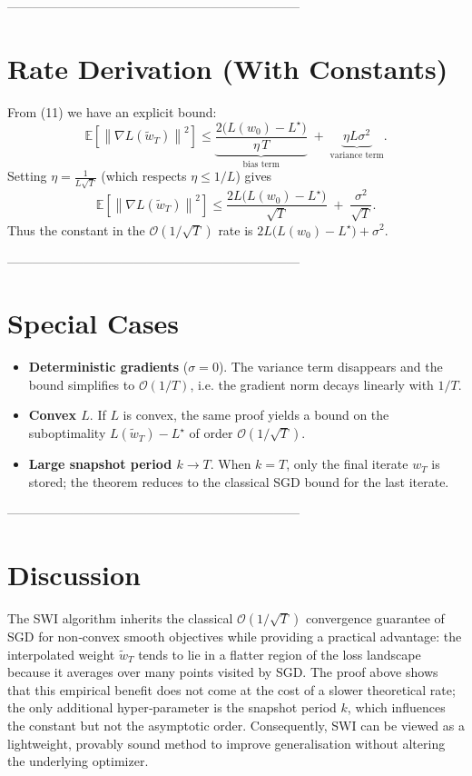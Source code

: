 \documentclass{article}
\newcommand{\E}{\mathbb{E}}
\newcommand{\norm}[1]{\left\lVert #1\right\rVert}
\begin{document}
---------------------------------------------------------------------

\section*{Rate Derivation (With Constants)}
From (11) we have an explicit bound:
\[
\E\!\left[\norm{\nabla L(\widetilde w_T)}^2\right]
\le \underbrace{\frac{2\big(L(w_0)-L^\star\big)}{\eta\,T}}_{\text{bias term}}
\;+\;\underbrace{\eta L\sigma^2}_{\text{variance term}} .
\]
Setting $\eta = \frac{1}{L\sqrt{T}}$ (which respects $\eta\le 1/L$) gives
\[
\E\!\left[\norm{\nabla L(\widetilde w_T)}^2\right]
\le \frac{2L\big(L(w_0)-L^\star\big)}{\sqrt{T}}
\;+\; \frac{\sigma^2}{\sqrt{T}} .
\]
Thus the constant in the $\mathcal{O}(1/\sqrt{T})$ rate is $2L\big(L(w_0)-L^\star\big)+\sigma^2$.

---------------------------------------------------------------------

\section*{Special Cases}
\begin{itemize}
  \item \textbf{Deterministic gradients} ($\sigma=0$). The variance term disappears and the bound simplifies to $\mathcal{O}(1/T)$, i.e. the gradient norm decays linearly with $1/T$.
  \item \textbf{Convex $L$}. If $L$ is convex, the same proof yields a bound on the suboptimality $L(\widetilde w_T)-L^\star$ of order $\mathcal{O}(1/\sqrt{T})$.
  \item \textbf{Large snapshot period $k\to T$}. When $k=T$, only the final iterate $w_T$ is stored; the theorem reduces to the classical SGD bound for the last iterate.
\end{itemize}

---------------------------------------------------------------------

\section*{Discussion}
The SWI algorithm inherits the classical $\mathcal{O}(1/\sqrt{T})$ convergence guarantee of SGD for non‑convex smooth objectives while providing a practical advantage: the interpolated weight $\widetilde w_T$ tends to lie in a flatter region of the loss landscape because it averages over many points visited by SGD. The proof above shows that this empirical benefit does not come at the cost of a slower theoretical rate; the only additional hyper‑parameter is the snapshot period $k$, which influences the constant but not the asymptotic order. Consequently, SWI can be viewed as a lightweight, provably sound method to improve generalisation without altering the underlying optimizer.
\end{document}
